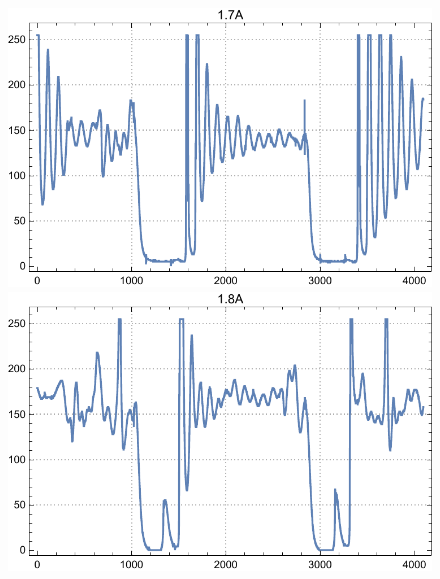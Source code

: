 \documentclass[a4paper, 12pt]{article}
\begin{document}
\begin{enumerate}
\begin{figure}[h]
			\endminipage\hfill
			\includegraphics[width=\linewidth]{1.7A.pdf}
			\endminipage\hfill
			\includegraphics[width=\linewidth]{1.8A.pdf}
			\endminipage
		\end{figure}
		\par
	\end{enumerate}
\end{document}
